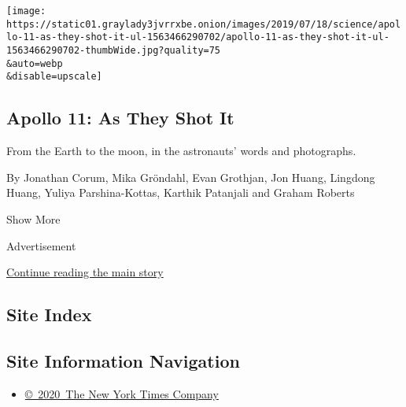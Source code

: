 \begin{enumerate}
  \texttt{[image: https://static01.graylady3jvrrxbe.onion/images/2019/07/18/science/apollo-11-as-they-shot-it-ul-1563466290702/apollo-11-as-they-shot-it-ul-1563466290702-thumbWide.jpg?quality=75\\\&auto=webp\\\&disable=upscale]}

  \hypertarget{apollo-11-as-they-shot-it}{%
  \subsection{Apollo 11: As They Shot
  It}\label{apollo-11-as-they-shot-it}}

  From the Earth to the moon, in the astronauts' words and photographs.

  By Jonathan Corum, Mika Gröndahl, Evan Grothjan, Jon Huang, Lingdong
  Huang, Yuliya Parshina-Kottas, Karthik Patanjali and Graham Roberts
\end{enumerate}

Show More

Advertisement

\protect\hyperlink{after-mid2}{Continue reading the main story}

\hypertarget{site-index}{%
\subsection{Site Index}\label{site-index}}

\hypertarget{site-information-navigation}{%
\subsection{Site Information
Navigation}\label{site-information-navigation}}

\begin{itemize}
\tightlist
\item
  \href{https://help.nytimes3xbfgragh.onion/hc/en-us/articles/115014792127-Copyright-notice}{©~2020~The
  New York Times Company}
\end{itemize}

